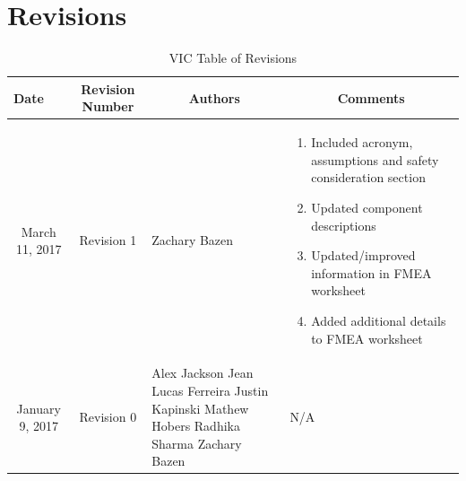 \documentclass [10pt]{article}
\begin{document}
\section{Revisions}
\begin{longtable}{| p{ } | p{ } | p{ } | p{ } |} \caption{VIC Table of Revisions}  \\

\hline 
\centering \textbf{Date} & 
\multicolumn{1}{c}{\textbf {Revision Number}} &
\multicolumn{1}{|c}{\textbf {Authors}} & 
\multicolumn{1}{|c|}{\textbf {Comments}} \\ \hline


\multicolumn{1}{|c|}{\multirow{1}{*}{\centering March 11, 2017}}  & 
\multicolumn{1}{c|}{\multirow{1}{*}{Revision 1}} &
\begin{minipage}{.21\columnwidth} \vspace {1mm}
    Zachary Bazen      \vspace{1mm}
\end{minipage}&
\begin{minipage} {.31\columnwidth}
    \vspace{1mm}\begin{enumerate}[label = - , leftmargin=0.15in]
        \itemsep -.1em
        \item Included acronym, assumptions and safety consideration section
        \item Updated component descriptions 
        \item Updated/improved  information in FMEA worksheet
        \item Added additional details to FMEA worksheet\vspace{1mm}
    \end{enumerate}
\end{minipage}\\ \hline 



\multicolumn{1}{|c|}{\multirow{1}{*}{\centering January 9, 2017}}  & 
\multicolumn{1}{c|}{\multirow{1}{*}{Revision 0}} & 
\begin{minipage}{.21\columnwidth} \vspace {1mm}
    Alex Jackson \newline
    Jean Lucas Ferreira \newline
    Justin Kapinski\newline
    Mathew Hobers\newline
    Radhika Sharma\newline
    Zachary Bazen      \vspace{1mm}
\end{minipage}
&
 \multirow{1}{*}{N/A} \\ 
\hline 


\end{longtable}
\pagebreak
\end{document}
